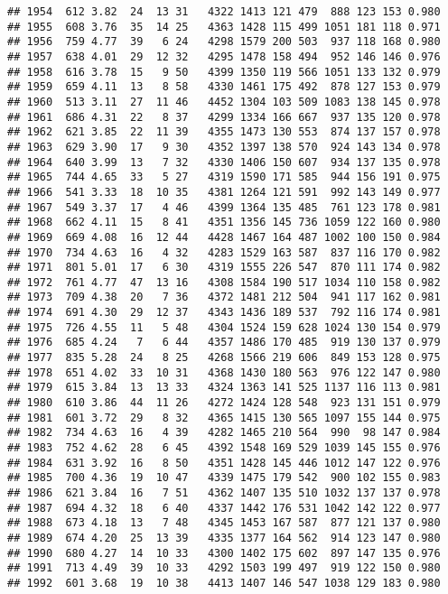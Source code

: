 \documentclass[]{article}
\begin{document}
\begin{verbatim}
## 1954  612 3.82  24  13 31   4322 1413 121 479  888 123 153 0.980
## 1955  608 3.76  35  14 25   4363 1428 115 499 1051 181 118 0.971
## 1956  759 4.77  39   6 24   4298 1579 200 503  937 118 168 0.980
## 1957  638 4.01  29  12 32   4295 1478 158 494  952 146 146 0.976
## 1958  616 3.78  15   9 50   4399 1350 119 566 1051 133 132 0.979
## 1959  659 4.11  13   8 58   4330 1461 175 492  878 127 153 0.979
## 1960  513 3.11  27  11 46   4452 1304 103 509 1083 138 145 0.978
## 1961  686 4.31  22   8 37   4299 1334 166 667  937 135 120 0.978
## 1962  621 3.85  22  11 39   4355 1473 130 553  874 137 157 0.978
## 1963  629 3.90  17   9 30   4352 1397 138 570  924 143 134 0.978
## 1964  640 3.99  13   7 32   4330 1406 150 607  934 137 135 0.978
## 1965  744 4.65  33   5 27   4319 1590 171 585  944 156 191 0.975
## 1966  541 3.33  18  10 35   4381 1264 121 591  992 143 149 0.977
## 1967  549 3.37  17   4 46   4399 1364 135 485  761 123 178 0.981
## 1968  662 4.11  15   8 41   4351 1356 145 736 1059 122 160 0.980
## 1969  669 4.08  16  12 44   4428 1467 164 487 1002 100 150 0.984
## 1970  734 4.63  16   4 32   4283 1529 163 587  837 116 170 0.982
## 1971  801 5.01  17   6 30   4319 1555 226 547  870 111 174 0.982
## 1972  761 4.77  47  13 16   4308 1584 190 517 1034 110 158 0.982
## 1973  709 4.38  20   7 36   4372 1481 212 504  941 117 162 0.981
## 1974  691 4.30  29  12 37   4343 1436 189 537  792 116 174 0.981
## 1975  726 4.55  11   5 48   4304 1524 159 628 1024 130 154 0.979
## 1976  685 4.24   7   6 44   4357 1486 170 485  919 130 137 0.979
## 1977  835 5.28  24   8 25   4268 1566 219 606  849 153 128 0.975
## 1978  651 4.02  33  10 31   4368 1430 180 563  976 122 147 0.980
## 1979  615 3.84  13  13 33   4324 1363 141 525 1137 116 113 0.981
## 1980  610 3.86  44  11 26   4272 1424 128 548  923 131 151 0.979
## 1981  601 3.72  29   8 32   4365 1415 130 565 1097 155 144 0.975
## 1982  734 4.63  16   4 39   4282 1465 210 564  990  98 147 0.984
## 1983  752 4.62  28   6 45   4392 1548 169 529 1039 145 155 0.976
## 1984  631 3.92  16   8 50   4351 1428 145 446 1012 147 122 0.976
## 1985  700 4.36  19  10 47   4339 1475 179 542  900 102 155 0.983
## 1986  621 3.84  16   7 51   4362 1407 135 510 1032 137 137 0.978
## 1987  694 4.32  18   6 40   4337 1442 176 531 1042 142 122 0.977
## 1988  673 4.18  13   7 48   4345 1453 167 587  877 121 137 0.980
## 1989  674 4.20  25  13 39   4335 1377 164 562  914 123 147 0.980
## 1990  680 4.27  14  10 33   4300 1402 175 602  897 147 135 0.976
## 1991  713 4.49  39  10 33   4292 1503 199 497  919 122 150 0.980
## 1992  601 3.68  19  10 38   4413 1407 146 547 1038 129 183 0.980

\end{verbatim}
\end{document}
